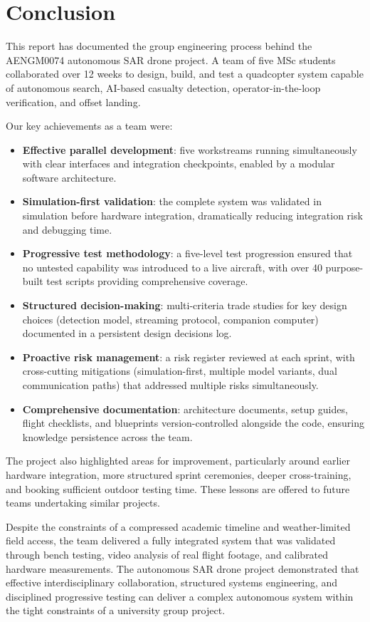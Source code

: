 \section{Conclusion}
\label{sec:conclusion}

This report has documented the group engineering process behind the AENGM0074 autonomous SAR drone project. A team of five MSc students collaborated over 12 weeks to design, build, and test a quadcopter system capable of autonomous search, AI-based casualty detection, operator-in-the-loop verification, and offset landing.

Our key achievements as a team were:

\begin{itemize}
  \item \textbf{Effective parallel development}: five workstreams running simultaneously with clear interfaces and integration checkpoints, enabled by a modular software architecture.
  \item \textbf{Simulation-first validation}: the complete system was validated in simulation before hardware integration, dramatically reducing integration risk and debugging time.
  \item \textbf{Progressive test methodology}: a five-level test progression ensured that no untested capability was introduced to a live aircraft, with over 40 purpose-built test scripts providing comprehensive coverage.
  \item \textbf{Structured decision-making}: multi-criteria trade studies for key design choices (detection model, streaming protocol, companion computer) documented in a persistent design decisions log.
  \item \textbf{Proactive risk management}: a risk register reviewed at each sprint, with cross-cutting mitigations (simulation-first, multiple model variants, dual communication paths) that addressed multiple risks simultaneously.
  \item \textbf{Comprehensive documentation}: architecture documents, setup guides, flight checklists, and blueprints version-controlled alongside the code, ensuring knowledge persistence across the team.
\end{itemize}

The project also highlighted areas for improvement, particularly around earlier hardware integration, more structured sprint ceremonies, deeper cross-training, and booking sufficient outdoor testing time. These lessons are offered to future teams undertaking similar projects.

Despite the constraints of a compressed academic timeline and weather-limited field access, the team delivered a fully integrated system that was validated through bench testing, video analysis of real flight footage, and calibrated hardware measurements. The autonomous SAR drone project demonstrated that effective interdisciplinary collaboration, structured systems engineering, and disciplined progressive testing can deliver a complex autonomous system within the tight constraints of a university group project.
